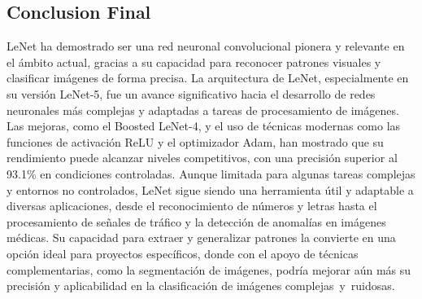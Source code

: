 \subsection{Conclusion Final}
LeNet ha demostrado ser una red neuronal convolucional pionera y relevante en el ámbito actual, 
gracias a su capacidad para reconocer patrones visuales y clasificar imágenes de forma precisa. 
La arquitectura de LeNet, especialmente en su versión LeNet-5, 
fue un avance significativo hacia el desarrollo de redes neuronales más complejas y adaptadas a 
tareas de procesamiento de imágenes. Las mejoras, como el Boosted LeNet-4, y el uso de técnicas 
modernas como las funciones de activación ReLU y el optimizador Adam, han mostrado que su rendimiento 
puede alcanzar niveles competitivos, con una precisión superior al 93.1\% en condiciones controladas. 
Aunque limitada para algunas tareas complejas y entornos no controlados, 
LeNet sigue siendo una herramienta útil y adaptable a diversas aplicaciones, 
desde el reconocimiento de números y letras hasta el procesamiento de señales de tráfico y la detección 
de anomalías en imágenes médicas. Su capacidad para extraer y generalizar patrones la convierte 
en una opción ideal para proyectos específicos, donde con el apoyo de técnicas complementarias, 
como la segmentación de imágenes, podría mejorar aún más su precisión y aplicabilidad en la clasificación 
de imágenes complejas y ruidosas.
